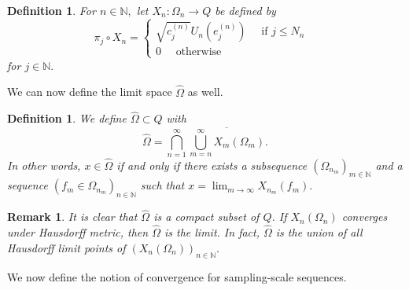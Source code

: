 \documentclass[10pt,a4paper]{amsart}
\newtheorem{definition}[thm]{Definition}
\newtheorem{remark}[thm]{Remark}
\def \HOM{\hat{\Omega}}
\begin{document}
\begin{definition}\label{definition_finite_embedding_cube}
	For $n\in\mathbb{N},$ let $X_n:\Omega_n\rightarrow Q$ be defined by $$\pi_j\circ X_n=\begin{cases}
		\sqrt{c_j^{(n)}}U_n(e_j^{(n)})\quad\text{ if $j\leq N_n$ }\\
		0\quad \text{ otherwise }
	\end{cases}$$ for $j\in\mathbb{N}.$%
\end{definition}

We can now define the limit space $\HOM$ as well.

\begin{definition}\label{definition_limit_space}
	We define $\HOM\subset Q$ with $$\HOM=\bigcap_{n=1}^{\infty}\overline{\bigcup_{m=n}^{\infty}X_m(\Omega_m)}.$$ In other words, $x\in\hat{\Omega}$ if and only if there exists a subsequence $(\Omega_{n_m})_{m\in\mathbb{N}}$ and a sequence $(f_m\in\Omega_{n_m})_{n\in\mathbb{N}}$ such that $x=\lim_{m\rightarrow\infty}X_{n_m}(f_m).$
\end{definition}
\begin{remark}
	It is clear that $\HOM$ is a compact subset of $Q$. If $X_n(\Omega_n)$ converges under Hausdorff metric, then $\HOM$ is the limit. In fact, $\HOM$ is the union of all Hausdorff limit points of $(X_n(\Omega_n))_{n\in\mathbb{N}}.$
\end{remark}

We now define the notion of convergence for sampling-scale sequences.
\end{document}
